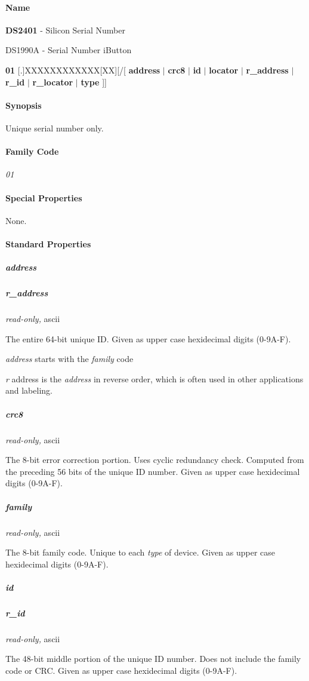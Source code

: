 \paragraph*{Name}
\textbf{DS2401} - Silicon Serial Number 

DS1990A - Serial Number iButton 

\textbf{01} [.]XXXXXXXXXXXX[XX][/[           \textbf{address}
$|$ \textbf{crc8} $|$ \textbf{id} $|$ \textbf{locator} $|$ \textbf{r\_address} $|$ \textbf{r\_id} $|$ \textbf{r\_locator} $|$ \textbf{type}  ]] 
\paragraph*{Synopsis}
Unique
serial number only. 
\paragraph*{Family Code}


\textit{01} 
\paragraph*{Special Properties}
None. 
\paragraph*{Standard Properties}

         
\subparagraph*{address}
\subparagraph*{r\_address}\textit{read-only,} ascii 

The entire 64-bit unique ID. Given as upper case hexidecimal digits (0-9A-F).


\textit{address} starts with the \textit{family} code 

\textit{r} address is the \textit{address} in reverse order, which is often used in other
applications and labeling. 
\subparagraph*{crc8}\textit{read-only,} ascii 

The 8-bit error correction portion. Uses cyclic redundancy check. Computed
from the preceding 56 bits of the unique ID number. Given as upper case
hexidecimal digits (0-9A-F). 
\subparagraph*{family}\textit{read-only,} ascii 

The 8-bit family code. Unique to each \textit{type} of device. Given as upper case
hexidecimal digits (0-9A-F). 
\subparagraph*{id}
\subparagraph*{r\_id}\textit{read-only,} ascii 

The 48-bit middle portion of the unique ID number. Does not include the family
code or CRC. Given as upper case hexidecimal digits (0-9A-F). 

